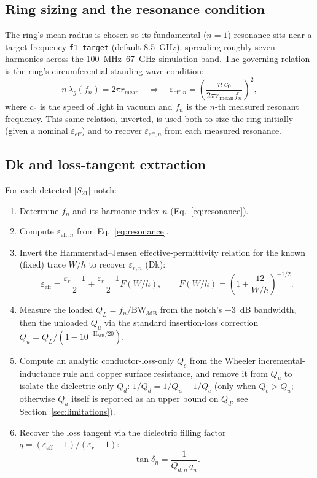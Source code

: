 \documentclass[11pt]{article}
\begin{document}
\subsection{Ring sizing and the resonance condition}
\label{sec:resonance}

The ring's mean radius is chosen so its fundamental ($n=1$) resonance sits
near a target frequency \texttt{f1\_target} (default 8.5~GHz), spreading
roughly seven harmonics across the 100~MHz--67~GHz simulation band. The
governing relation is the ring's circumferential standing-wave condition:
\begin{equation}
n\,\lambda_g(f_n) = 2\pi r_{\mathrm{mean}}
\quad\Longrightarrow\quad
\varepsilon_{\mathrm{eff}, n} =
\left(\frac{n\,c_0}{2\pi r_{\mathrm{mean}} f_n}\right)^{2},
\label{eq:resonance}
\end{equation}
where $c_0$ is the speed of light in vacuum and $f_n$ is the $n$-th measured
resonant frequency. This same relation, inverted, is used both to size the
ring initially (given a nominal $\varepsilon_{\mathrm{eff}}$) and to
recover $\varepsilon_{\mathrm{eff}, n}$ from each measured resonance.

\subsection{Dk and loss-tangent extraction}

For each detected $|S_{21}|$ notch:
\begin{enumerate}
\item Determine $f_n$ and its harmonic index $n$ (Eq.~\ref{eq:resonance}).
\item Compute $\varepsilon_{\mathrm{eff}, n}$ from Eq.~\ref{eq:resonance}.
\item Invert the Hammerstad--Jensen effective-permittivity relation for the
known (fixed) trace $W/h$ to recover $\varepsilon_{r,n}$ (Dk):
\[
\varepsilon_{\mathrm{eff}} = \frac{\varepsilon_r + 1}{2}
  + \frac{\varepsilon_r - 1}{2} F(W/h), \qquad
  F(W/h) = \left(1 + \frac{12}{W/h}\right)^{-1/2}.
\]
\item Measure the loaded $Q_L = f_n / \mathrm{BW}_{3\mathrm{dB}}$ from the
notch's $-3$~dB bandwidth, then the unloaded $Q_u$ via the standard
insertion-loss correction $Q_u = Q_L / (1 - 10^{-\mathrm{IL_{dB}}/20})$.
\item Compute an analytic conductor-loss-only $Q_c$ from the Wheeler
incremental-inductance rule and copper surface resistance, and remove it
from $Q_u$ to isolate the dielectric-only $Q_d$:
$1/Q_d = 1/Q_u - 1/Q_c$ (only when $Q_c > Q_u$; otherwise $Q_u$ itself is
reported as an upper bound on $Q_d$, see Section~\ref{sec:limitations}).
\item Recover the loss tangent via the dielectric filling factor
$q = (\varepsilon_{\mathrm{eff}} - 1)/(\varepsilon_r - 1)$:
\[
\tan\delta_n = \frac{1}{Q_{d,n}\, q_n}.
\]
\end{enumerate}
\end{document}

